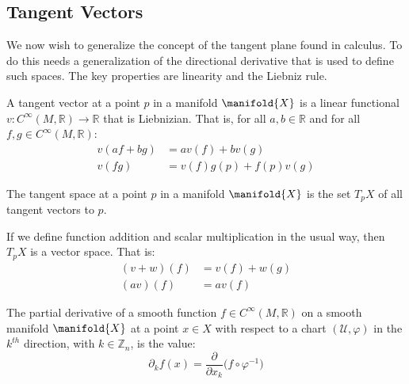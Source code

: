 \documentclass{article}                                                        %
\begin{document}
        \subsection{Tangent Vectors}
            We now wish to generalize the concept of the tangent plane found in
            calculus. To do this needs a generalization of the directional
            derivative that is used to define such spaces. The key properties
            are linearity and the Liebniz rule.
            \begin{definition}
                A tangent vector at a point $p$ in a manifold $\manifold{X}$ is
                a linear functional
                $v:C^{\infty}(M,\mathbb{R})\rightarrow\mathbb{R}$ that is
                Liebnizian. That is, for all $a,b\in\mathbb{R}$ and for all
                $f,g\in{C}^{\infty}(M,\mathbb{R})$:
                \begin{align}
                    v(af+bg)&=av(f)+bv(g)\tag{Linearity}\\
                    v(fg)&=v(f)g(p)+f(p)v(g)\tag{Liebnizian}
                \end{align}
            \end{definition}
            \begin{definition}
                The tangent space at a point $p$ in a manifold $\manifold{X}$
                is the set $T_{p}X$ of all tangent vectors to $p$.
            \end{definition}
            If we define function addition and scalar multiplication in the
            usual way, then $T_{p}X$ is a vector space. That is:
            \begin{align}
                (v+w)(f)&=v(f)+w(g)\\
                (av)(f)&=av(f)
            \end{align}
            \begin{definition}
                The partial derivative of a smooth function
                $f\in{C}^{\infty}(M,\mathbb{R})$ on a smooth manifold
                $\manifold{X}$ at a point $x\in{X}$ with respect to a chart
                $(\mathcal{U},\varphi)$ in the $k^{th}$ direction, with
                $k\in\mathbb{Z}_{n}$, is the value:
                \begin{equation}
                    \partial_{k}f(x)=
                        \frac{\partial}{\partial{x}_{k}}
                        \Big(f\circ\varphi^{\minus{1}}\Big)
                \end{equation}
            \end{definition}
\end{document}
